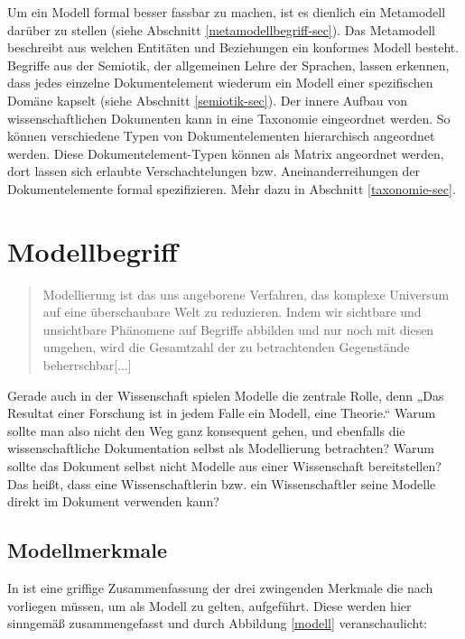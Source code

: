  
Um ein Modell formal besser fassbar zu machen, ist es dienlich ein Metamodell darüber zu stellen (siehe Abschnitt \ref{metamodellbegriff-sec}). Das Metamodell beschreibt aus welchen Entitäten und Beziehungen ein konformes Modell besteht. Begriffe aus der Semiotik, der allgemeinen Lehre der Sprachen, lassen erkennen, dass jedes einzelne Dokumentelement wiederum ein Modell einer spezifischen Domäne kapselt (siehe Abschnitt \ref{semiotik-sec}). Der innere Aufbau von wissenschaftlichen Dokumenten kann in eine Taxonomie eingeordnet werden. So können verschiedene Typen von Dokumentelementen hierarchisch angeordnet werden. Diese Dokumentelement-Typen können als Matrix angeordnet werden, dort lassen sich erlaubte Verschachtelungen bzw. Aneinanderreihungen der Dokumentelemente formal spezifizieren. Mehr dazu in Abschnitt \ref{taxonomie-sec}.

 
\section{Modellbegriff}\label{modellbegriff-sec}
 
\begin{quote}
 Modellierung ist das uns angeborene Verfahren, das komplexe Universum auf eine überschaubare Welt zu reduzieren. Indem wir sichtbare und unsichtbare Phänomene auf Begriffe abbilden und nur noch mit diesen umgehen, wird die Gesamtzahl der zu betrachtenden Gegenstände beherrschbar[...] \citep[S.~7]{Ludewig}
\end{quote}
 
Gerade auch in der Wissenschaft spielen Modelle die zentrale Rolle, denn „Das Resultat einer Forschung ist in jedem Falle ein Modell, eine Theorie.“ \citep[S.~8]{Ludewig} Warum sollte man also nicht den Weg ganz konsequent gehen, und ebenfalls die wissenschaftliche Dokumentation selbst als Modellierung betrachten? Warum sollte das Dokument selbst nicht Modelle aus einer Wissenschaft bereitstellen? Das heißt, dass eine Wissenschaftlerin bzw. ein Wissenschaftler seine Modelle direkt im Dokument verwenden kann?

 
\subsection{Modellmerkmale}\label{modellmerkmale}
 
In \citep[S.~9]{Ludewig} ist eine griffige Zusammenfassung der drei zwingenden Merkmale die nach \citep{Stachowiak} vorliegen müssen, um als Modell zu gelten, aufgeführt. Diese werden hier sinngemäß zusammengefasst und durch Abbildung \ref{modell} veranschaulicht:

